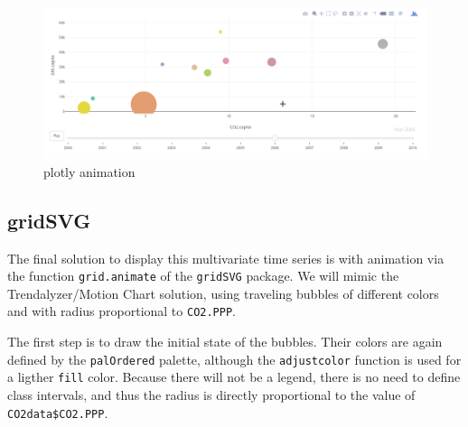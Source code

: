 \begin{figure}[htbp]
\centering
\includegraphics[width=.9\linewidth]{figs/plotly_animation.png}
\caption{plotly animation \label{fig:plotly_animation}}
\end{figure}

\subsection{\floweroneleft gridSVG}
\label{sec:org00d79b1}
The final solution to display this multivariate time series is with
animation via the function \texttt{grid.animate} of the \texttt{gridSVG}
package. We will mimic the Trendalyzer/Motion Chart solution, using
traveling bubbles of different colors and with radius proportional to
\texttt{CO2.PPP}.

The first step is to draw the initial state of the bubbles. Their
colors are again defined by the \texttt{palOrdered} palette, although the
\texttt{adjustcolor} function is used for a ligther \texttt{fill} color. Because
there will not be a legend, there is no need to define class
intervals, and thus the radius is directly proportional to the value
of \texttt{CO2data\$CO2.PPP}.


